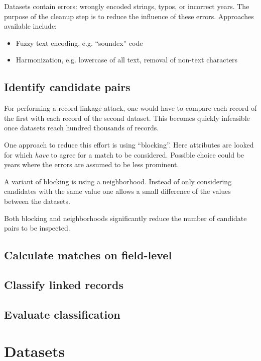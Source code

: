 \documentclass[sigconf,nonacm]{acmart}
\begin{document}
Datasets contain errors: wrongly encoded strings, typos, or
incorrect years.
The purpose of the cleanup step is to reduce the influence of these
errors.
Approaches available include:
\begin{itemize}
\item Fuzzy text encoding, e.g. ``soundex'' code
\item Harmonization, e.g. lowercase of all text, removal of non-text characters
\end{itemize}

\subsection{Identify candidate pairs}

For performing a record linkage attack, one would have to compare each
record of the first with each record of the second dataset.
This becomes quickly infeasible once datasets reach hundred thousands
of records.

One approach to reduce this effort is using ``blocking''.
Here attributes are looked for which \emph{have} to agree for a
match to be considered.
Possible choice could be years where the errors are assumed to be
less prominent.

A variant of blocking is using a neighborhood. Instead of only
considering candidates with the same value one allows a small
difference of the values between the datasets.

Both blocking and neighborhoods significantly reduce the number
of candidate pairs to be inspected.

\subsection{Calculate matches on field-level}

\subsection{Classify linked records}

\subsection{Evaluate classification}

\section{Datasets}
\end{document}
